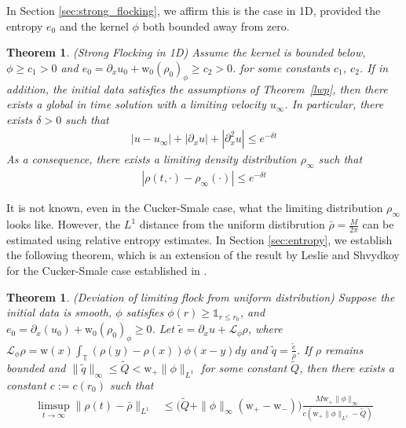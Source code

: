 \documentclass[11pt,letterpaper]{amsart}
\theoremstyle{plain}
\newtheorem{theorem}[THEOREM]{Theorem}
\theoremstyle{definition}
\theoremstyle{remark}
\newcommand{\thm}[1]{Theorem~\ref{#1}}
\newcommand{\T}{\ensuremath{\mathbb{T}}}   %
\def \cL {\mathcal{L}}
\renewcommand{\geq}{\geqslant}
\renewcommand{\leq}{\leqslant}
\def\T{\mathbb{T}}
\def \wt {\mathrm{w}}
\begin{document}
In Section \ref{sec:strong_flocking}, we affirm this is the case in 1D, provided the entropy $e_0$ and the kernel $\phi$ both bounded away from zero.
\begin{theorem} (Strong Flocking in 1D)
    \label{thm:strong_flocking_intro}
    Assume the kernel is bounded below, $\phi \geq c_1 > 0$ and $e_0 = \partial_x u_0 + \wt_0 (\rho_0)_{\phi} \geq c_2 > 0$.  
    for some constants $c_1$, $c_2$.  If in addition, the initial data satisfies the 
    assumptions of \thm{lwp}, then 
    there exists a global in time solution with a limiting velocity $u_{\infty}$. In particular, there exists $\delta > 0$ such that 
    \begin{align*}
        |u - u_{\infty}| + |\partial_x u| + |\partial_x^2 u| \leq e^{-\delta t} 
    \end{align*}
    As a consequence, there exists a limiting density distribution $\rho_{\infty}$ such that 
    \begin{align*}
        |\rho(t, \cdot) - \rho_{\infty}(\cdot)| \leq e^{-\delta t}
    \end{align*}
\end{theorem}

It is not known, even in the Cucker-Smale case, what the limiting distribution $\rho_{\infty}$ looks like. 
However, the $L^1$ distance from the uniform distibrution $\bar{\rho} = \frac{M}{2\pi}$ can be estimated using relative entropy estimates. 
In Section \ref{sec:entropy}, we establish the following theorem, which is an extension of the result by Leslie and Shvydkoy for the 
Cucker-Smale case established in \cite{LS-entropy}.
\begin{theorem} (Deviation of limiting flock from uniform distribution)
    \label{thm:entropy_estimate_intro}
    Suppose the initial data is smooth, $\phi$ satisfies $\phi(r) \geq \mathds{1}_{r \leq r_0}$, and $e_0 = \partial_x(u_0) + \wt_0 (\rho_0)_{\phi} \geq 0$.
    Let $\tilde{e} = \partial_x u + \cL_{\phi} \rho$, where $\cL_{\phi} \rho = \wt(x) \int_{\T} (\rho(y) - \rho(x)) \phi(x-y) dy$ 
    and $\tilde{q} = \frac{\tilde{e}}{\rho}$. 
    If $\rho$ remains bounded and $\|\tilde{q}\|_{\infty} \leq \tilde{Q} < \wt_+ \|\phi\|_{L^1}$ for some constant $\tilde{Q}$, 
    then there exists a constant $c := c(r_0)$ such that 
    \begin{align*}
        \limsup_{t \to \infty} \|\rho(t) - \bar{\rho} \|_{L^1} 
            &\leq  \Big( \tilde{Q} +  \|\phi\|_{\infty} (\wt_+ - \wt_-) \Big) \frac{M \wt_+ \|\phi\|_{\infty}}{c(\wt_+ \|\phi\|_{L^1} - \tilde{Q})} \\
    \end{align*}
\end{theorem}
\end{document}

